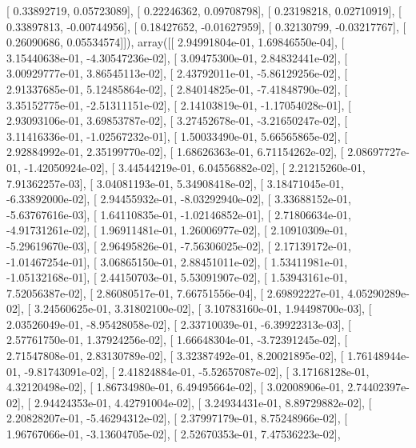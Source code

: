 \documentclass{article}
\begin{document}
       [ 0.33892719,  0.05723089],
       [ 0.22246362,  0.09708798],
       [ 0.23198218,  0.02710919],
       [ 0.33897813, -0.00744956],
       [ 0.18427652, -0.01627959],
       [ 0.32130799, -0.03217767],
       [ 0.26090686,  0.05534574]]), array([[  2.94991804e-01,   1.69846550e-04],
       [  3.15440638e-01,  -4.30547236e-02],
       [  3.09475300e-01,   2.84832441e-02],
       [  3.00929777e-01,   3.86545113e-02],
       [  2.43792011e-01,  -5.86129256e-02],
       [  2.91337685e-01,   5.12485864e-02],
       [  2.84014825e-01,  -7.41848790e-02],
       [  3.35152775e-01,  -2.51311151e-02],
       [  2.14103819e-01,  -1.17054028e-01],
       [  2.93093106e-01,   3.69853787e-02],
       [  3.27452678e-01,  -3.21650247e-02],
       [  3.11416336e-01,  -1.02567232e-01],
       [  1.50033490e-01,   5.66565865e-02],
       [  2.92884992e-01,   2.35199770e-02],
       [  1.68626363e-01,   6.71154262e-02],
       [  2.08697727e-01,  -1.42050924e-02],
       [  3.44544219e-01,   6.04556882e-02],
       [  2.21215260e-01,   7.91362257e-03],
       [  3.04081193e-01,   5.34908418e-02],
       [  3.18471045e-01,  -6.33892000e-02],
       [  2.94455932e-01,  -8.03292940e-02],
       [  3.33688152e-01,  -5.63767616e-03],
       [  1.64110835e-01,  -1.02146852e-01],
       [  2.71806634e-01,  -4.91731261e-02],
       [  1.96911481e-01,   1.26006977e-02],
       [  2.10910309e-01,  -5.29619670e-03],
       [  2.96495826e-01,  -7.56306025e-02],
       [  2.17139172e-01,  -1.01467254e-01],
       [  3.06865150e-01,   2.88451011e-02],
       [  1.53411981e-01,  -1.05132168e-01],
       [  2.44150703e-01,   5.53091907e-02],
       [  1.53943161e-01,   7.52056387e-02],
       [  2.86080517e-01,   7.66751556e-04],
       [  2.69892227e-01,   4.05290289e-02],
       [  3.24560625e-01,   3.31802100e-02],
       [  3.10783160e-01,   1.94498700e-03],
       [  2.03526049e-01,  -8.95428058e-02],
       [  2.33710039e-01,  -6.39922313e-03],
       [  2.57761750e-01,   1.37924256e-02],
       [  1.66648304e-01,  -3.72391245e-02],
       [  2.71547808e-01,   2.83130789e-02],
       [  3.32387492e-01,   8.20021895e-02],
       [  1.76148944e-01,  -9.81743091e-02],
       [  2.41824884e-01,  -5.52657087e-02],
       [  3.17168128e-01,   4.32120498e-02],
       [  1.86734980e-01,   6.49495664e-02],
       [  3.02008906e-01,   2.74402397e-02],
       [  2.94424353e-01,   4.42791004e-02],
       [  3.24934431e-01,   8.89729882e-02],
       [  2.20828207e-01,  -5.46294312e-02],
       [  2.37997179e-01,   8.75248966e-02],
       [  1.96767066e-01,  -3.13604705e-02],
       [  2.52670353e-01,   7.47536223e-02],
\end{document}

